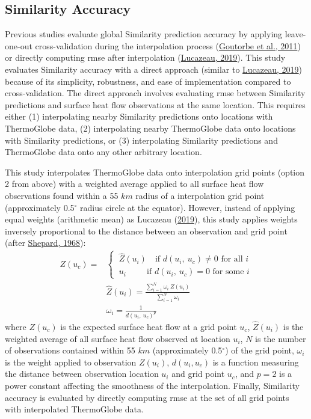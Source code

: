 \hypertarget{similarity-accuracy}{%
\subsection{Similarity Accuracy}\label{similarity-accuracy}}

Previous studies evaluate global Similarity prediction accuracy by applying leave-one-out cross-validation during the interpolation process (\protect\hyperlink{ref-goutorbe2011}{Goutorbe et al., 2011}) or directly computing \gls{rmse} after interpolation (\protect\hyperlink{ref-lucazeau2019}{Lucazeau, 2019}). This study evaluates Similarity accuracy with a direct approach (similar to \protect\hyperlink{ref-lucazeau2019}{Lucazeau, 2019}) because of its simplicity, robustness, and ease of implementation compared to cross-validation. The direct approach involves evaluating \gls{rmse} between Similarity predictions and surface heat flow observations at the same location. This requires either (1) interpolating nearby Similarity predictions onto locations with ThermoGlobe data, (2) interpolating nearby ThermoGlobe data onto locations with Similarity predictions, or (3) interpolating Similarity predictions and ThermoGlobe data onto any other arbitrary location.

This study interpolates ThermoGlobe data onto interpolation grid points (option 2 from above) with a weighted average applied to all surface heat flow observations found within a 55 \(km\) radius of a interpolation grid point (approximately 0.5\(^\circ\) radius circle at the equator). However, instead of applying equal weights (arithmetic mean) as Lucazeau (\protect\hyperlink{ref-lucazeau2019}{2019}), this study applies weights inversely proportional to the distance between an observation and grid point (after \protect\hyperlink{ref-shepard1968}{Shepard, 1968}):
\begin{equation}
  \begin{aligned}
    Z(u_c) =&
    \begin{cases}
      \ \hat{Z}(u_i) \quad \text{if } d(u_i,\ u_c) \neq 0 \text{ for all } i \\
      \ u_i \quad \quad \ \ \text{if } d(u_i,\ u_c) = 0 \text{ for some } i
    \end{cases} \\
    &\hat{Z}(u_i) = \frac{\sum_{i=1}^N \omega_i\ Z(u_i)}{\sum_{i=1}^N \omega_i} \\
    &\omega_i = \frac{1}{d(u_i,\ u_c)^p}
  \end{aligned}
  \label{eq:idw}
\end{equation}
where \(Z(u_c)\) is the expected surface heat flow at a grid point \(u_c\), \(\hat{Z}(u_i)\) is the weighted average of all surface heat flow observed at location \(u_i\), \(N\) is the number of observations contained within 55 \(km\) (approximately 0.5\(^\circ\)) of the grid point, \(\omega_i\) is the weight applied to observation \(Z(u_i)\), \(d(u_i, u_c)\) is a function measuring the distance between observation location \(u_i\) and grid point \(u_c\), and \(p=2\) is a power constant affecting the smoothness of the interpolation. Finally, Similarity accuracy is evaluated by directly computing \gls{rmse} at the set of all grid points with interpolated ThermoGlobe data.

